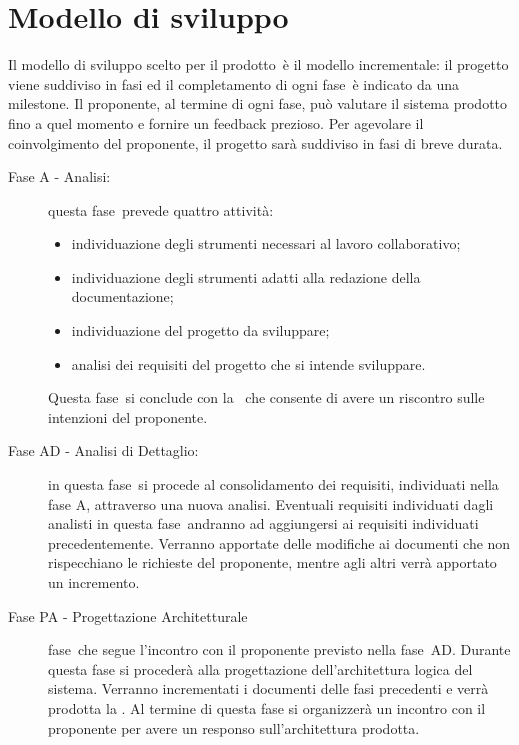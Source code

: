 \documentclass[../PianoProgetto.tex]{subfiles}
\begin{document}
\section{Modello di sviluppo}

	Il modello di sviluppo scelto per il prodotto\g\ è il modello incrementale\g : il progetto viene suddiviso in fasi ed il completamento di ogni fase\g\ è indicato da una milestone\g .
	Il proponente, al termine di ogni fase\g, può valutare il sistema prodotto fino a quel momento e fornire un feedback prezioso.
	Per agevolare il coinvolgimento del proponente, il progetto sarà suddiviso in fasi di breve durata.
	\begin{description}
	
	\item[Fase A - Analisi:] questa fase\g\ prevede quattro attività:
		\begin{itemize}
		\item individuazione degli strumenti necessari al lavoro collaborativo;
		\item individuazione degli strumenti adatti alla redazione della documentazione;
		\item individuazione del progetto da sviluppare;
		\item analisi dei requisiti del progetto che si intende sviluppare.
		\end{itemize}
		Questa fase\g\ si conclude con la \revisionedeirequisiti\ che consente di avere un riscontro sulle intenzioni del proponente.


	\item[Fase AD - Analisi di Dettaglio:]
	in questa fase\g\ si procede al consolidamento dei requisiti, individuati nella fase A, attraverso una nuova analisi.
	Eventuali requisiti individuati dagli analisti in questa fase\g\ andranno ad aggiungersi ai requisiti individuati precedentemente. 
	Verranno apportate delle modifiche ai documenti che non rispecchiano le richieste del proponente, mentre agli altri verrà apportato un incremento.

	\item[Fase PA - Progettazione Architetturale]
		fase\g\ che segue l'incontro con il proponente previsto nella fase\g\ AD. Durante questa fase si procederà alla progettazione dell'architettura logica del sistema. Verranno incrementati i documenti delle fasi precedenti e verrà prodotta la \specificatecnica . Al termine di questa fase si organizzerà un incontro con il proponente per avere un responso sull'architettura prodotta.


\end{description}
\end{document}
